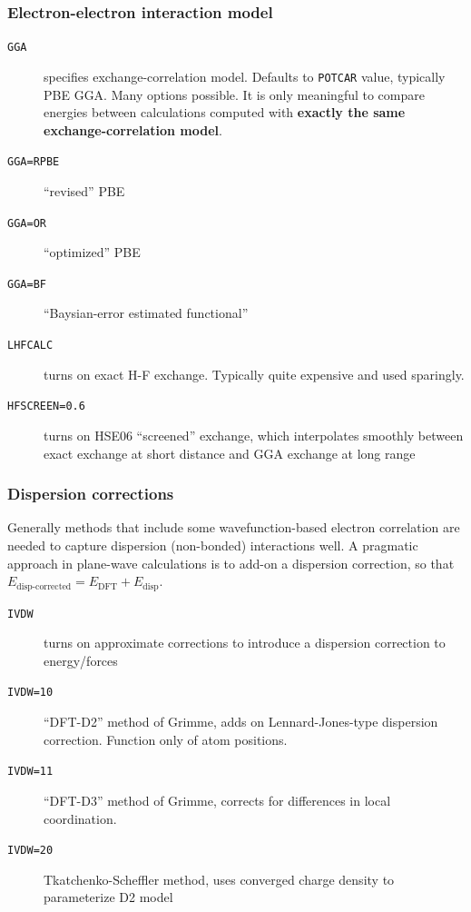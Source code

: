 \documentclass[11pt]{article}
\begin{document}
\subsubsection{Electron-electron interaction model}
\label{sec:org836068b}
\begin{description}
\item[{\texttt{GGA}}] specifies exchange-correlation model. Defaults to \texttt{POTCAR} value, typically PBE GGA.   Many options possible. It is only meaningful to compare energies between calculations computed with \textbf{exactly the same exchange-correlation model}.
\item[{\texttt{GGA=RPBE}}] ``revised'' PBE
\item[{\texttt{GGA=OR}}] ``optimized'' PBE
\item[{\texttt{GGA=BF}}] ``Baysian-error estimated functional''
\item[{\texttt{LHFCALC}}] turns on exact H-F exchange.  Typically quite expensive and used sparingly.
\item[{\texttt{HFSCREEN=0.6}}] turns on HSE06 ``screened'' exchange, which interpolates smoothly between exact exchange at short distance and GGA exchange at long range
\end{description}

\subsubsection{Dispersion corrections}
\label{sec:org7c743fc}
Generally methods that include some wavefunction-based electron correlation are needed to capture dispersion (non-bonded) interactions well. A pragmatic approach in plane-wave calculations is to add-on a dispersion correction, so that \(E_\text{disp-corrected} = E_\text{DFT} + E_\text{disp}\).
\begin{description}
\item[{\texttt{IVDW}}] turns on approximate corrections to introduce a dispersion correction to energy/forces
\item[{\texttt{IVDW=10}}] ``DFT-D2'' method of Grimme, adds on Lennard-Jones-type dispersion correction. Function only of atom positions.
\item[{\texttt{IVDW=11}}] ``DFT-D3'' method of Grimme, corrects for differences in local coordination.
\item[{\texttt{IVDW=20}}] Tkatchenko-Scheffler method, uses converged charge density to parameterize D2 model
\end{description}
\end{document}
